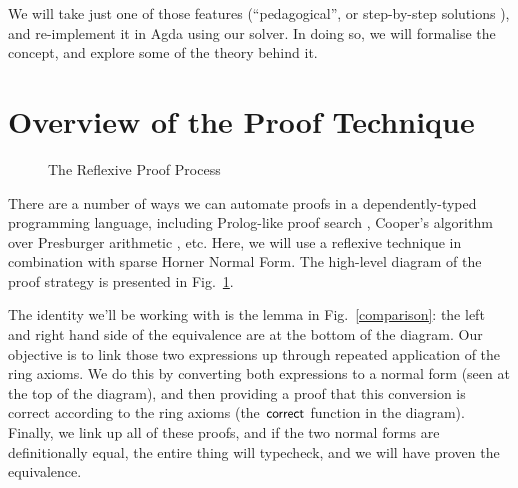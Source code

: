 \documentclass[acmsmall,review,anonymous]{acmart}\settopmatter{printfolios=true,printccs=false,printacmref=false}
\theoremstyle{remark}
\begin{document}
\begin{description}
    We will take just one of those features (``pedagogical'', or step-by-step
    solutions \cite{the_development_team_step-by-step_2009}), and re-implement
    it in Agda using our solver. In doing so, we will formalise the concept, and
    explore some of the theory behind it. 
\end{description}
\section{Overview of the Proof Technique}
\begin{figure}[b]
  \vspace*{-50pt}
  \caption{The Reflexive Proof Process}
  \label{proof-process}
\end{figure}

There are a number of ways we can automate proofs in a dependently-typed
programming language, including Prolog-like proof search \cite{kokke_auto_2015},
Cooper's algorithm over Presburger arithmetic \cite{allais_deciding_2011}, etc.
Here, we will use a reflexive technique \cite{boutin_using_1997} in combination
with sparse Horner Normal Form. The high-level diagram of the proof strategy is
presented in Fig.~\ref{proof-process}.

The identity we'll be working with is the lemma in Fig.~\ref{comparison}: the
left and right hand side of the equivalence are at the bottom of the diagram. Our
objective is to link those two expressions up through repeated application of
the ring axioms. We do this by converting both expressions to a normal form
(seen at the top of the diagram), and then providing a proof that this
conversion is correct according to the ring axioms (the
\(\AgdaFunction{correct}\) function in the diagram). Finally, we link up all of
these proofs, and if the two normal forms are definitionally equal, the entire
thing will typecheck, and we will have proven the equivalence.
\end{document}
